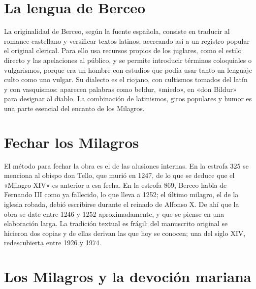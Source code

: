 \documentclass{book}
\begin{document}

\section{La lengua de Berceo}

La originalidad de Berceo, según la fuente española, consiste en traducir al romance castellano y versificar textos latinos, acercando así a un registro popular el original clerical. Para ello usa recursos propios de los juglares, como el estilo directo y las apelaciones al público, y se permite introducir términos coloquiales o vulgarismos, porque era un hombre con estudios que podía usar tanto un lenguaje culto como uno vulgar. Su dialecto es el riojano, con cultismos tomados del latín y con vasquismos: aparecen palabras como beldur, «miedo», en «don Bildur» para designar al diablo. La combinación de latinismos, giros populares y humor es una parte esencial del encanto de los Milagros.


\section{Fechar los Milagros}

El método para fechar la obra es el de las alusiones internas. En la estrofa 325 se menciona al obispo don Tello, que murió en 1247, de lo que se deduce que el «Milagro XIV» es anterior a esa fecha. En la estrofa 869, Berceo habla de Fernando III como ya fallecido, lo que lleva a 1252; el último milagro, el de la iglesia robada, debió escribirse durante el reinado de Alfonso X. De ahí que la obra se date entre 1246 y 1252 aproximadamente, y que se piense en una elaboración larga. La tradición textual es frágil: del manuscrito original se hicieron dos copias y de ellas derivan las que hoy se conocen; una del siglo XIV, redescubierta entre 1926 y 1974.


\section{Los Milagros y la devoción mariana}
\end{document}
